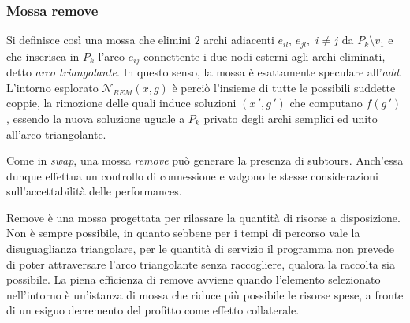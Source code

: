 \subsubsection{Mossa remove} %
	Si definisce così una mossa che elimini $2$ archi adiacenti
	$e_{il},\,e_{jl},\,\, i\neq j$ da $P_k\setminus v_1$ e che inserisca in $P_k$ l'arco $e_{ij}$ connettente i due nodi esterni agli archi eliminati, 
	detto \emph{arco triangolante}. In questo senso, la mossa è esattamente speculare all'\emph{add}.
	L'intorno esplorato $\mathcal{N}_{REM}(x,g)$ è perciò l'insieme di tutte le possibili suddette coppie, la rimozione delle quali induce soluzioni 
	$(x\,\prime,g\,\prime)$ che computano $f(g\,\prime)$, essendo la nuova soluzione uguale a $P_k$ privato degli archi semplici ed unito all'arco triangolante.
	
	Come in \emph{swap}, una mossa \emph{remove} può generare la presenza di subtours. Anch'essa dunque effettua un controllo di connessione e valgono le stesse
	considerazioni sull'accettabilità delle performances.
	
	Remove è una mossa progettata per rilassare la quantità di risorse a
	disposizione. Non è sempre possibile, in quanto sebbene per i tempi di percorso vale la disuguaglianza triangolare, per le quantità di servizio 
	il programma non prevede di poter attraversare l'arco triangolante senza raccogliere, qualora la raccolta sia possibile.
	La piena efficienza di remove avviene quando l'elemento selezionato nell'intorno è un'istanza di mossa che riduce più possibile le risorse spese,
	a fronte di un esiguo decremento del profitto come effetto collaterale.
	
	
